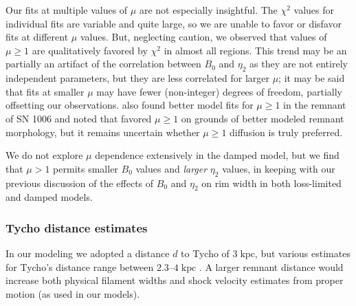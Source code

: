 \documentclass[iop, apj, numberedappendix]{emulateapj}
\newcommand*{\mt}{\mathrm}
\newcommand*{\unit}[1]{\;\mt{#1}}  %
\begin{document}
Our fits at multiple values of $\mu$ are not especially insightful.
The $\chi^2$ values for individual fits are variable and quite large, so we are
unable to favor or disfavor fits at different $\mu$ values.  But, neglecting
caution, we observed that values of $\mu \geq 1$ are qualitatively favored by
$\chi^2$ in almost all regions.  This trend may be an partially an artifact of
the correlation between $B_0$ and $\eta_2$ as they are not entirely independent
parameters, but they are less correlated for larger $\mu$; it may be said that
fits at smaller $\mu$ may have fewer (non-integer) degrees of freedom,
partially offsetting our observations.   also found
better model fits for $\mu \geq 1$ in the remnant of SN 1006 and noted that
\citet{reynolds2004} favored $\mu \geq 1$ on grounds of better modeled remnant
morphology, but it remains uncertain whether $\mu \geq 1$ diffusion is truly
preferred.

We do not explore $\mu$ dependence extensively in the damped model, but we find
that $\mu > 1$ permits smaller $B_0$ values and \emph{larger} $\eta_2$ values,
in keeping with our previous discussion of the effects of $B_0$ and $\eta_2$ on
rim width in both loss-limited and damped models.

\subsubsection{Tycho distance estimates}

In our modeling we adopted a distance $d$ to Tycho of $3 \unit{kpc}$, but
various estimates for Tycho's distance range between $2.3$--$4 \unit{kpc}$
\citep{hayato2010}.  A larger remnant distance would increase both physical
filament widths and shock velocity estimates from proper motion (as used in our
models).
\end{document}
